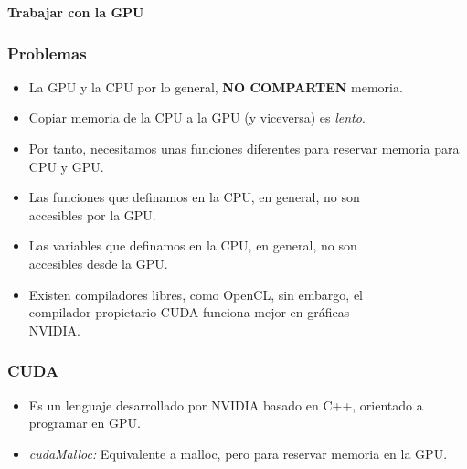 \documentclass[aspectratio=169]{beamer}
\begin{document}
\begin{frame}
	\centering \LARGE \bfseries \color{naranjaUCA} Trabajar con la GPU
\end{frame}

\begin{frame}
	\frametitle{Problemas}
	
	\begin{itemize}
		\item La GPU y la CPU por lo general, \textbf{NO COMPARTEN} memoria. \pause
		\item Copiar memoria de la CPU a la GPU (y viceversa) es \textit{lento}.\pause
		\item Por tanto, necesitamos unas funciones diferentes para reservar memoria para CPU y GPU. \pause
		\item Las funciones que definamos en la CPU, en general, no son\\ accesibles por la GPU. \pause
		\item Las variables que definamos en la CPU, en general, no son \\accesibles desde la GPU. \pause
		\item Existen compiladores libres, como OpenCL, sin embargo, el \\compilador propietario CUDA funciona mejor en gráficas\\ NVIDIA.
	\end{itemize}
\end{frame}

\begin{frame}
	\frametitle{CUDA}
	
	\begin{itemize}
		\item Es un lenguaje desarrollado por NVIDIA basado en C++, orientado a programar en GPU. \pause
		\item \textit{cudaMalloc: } Equivalente a malloc, pero para reservar memoria en la GPU.
	\end{itemize}
\end{frame}
\end{document}
